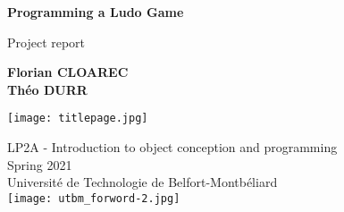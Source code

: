 \begin{titlepage}
    \begin{center}
        \vspace*{1cm}
            
        \Huge
        \textbf{Programming a Ludo Game}
            
        \vspace{0.5cm}
        \LARGE
        Project report
            
        \vspace{1.5cm}
            
        \textbf{Florian CLOAREC} \\
        \textbf{Théo DURR}
        
        \vspace{1.5cm}
        
        \texttt{[image: titlepage.jpg]}

        \vfill
                  
        
        \Large
        LP2A - Introduction to object conception and programming \\
        Spring 2021\\
        Université de Technologie de Belfort-Montbéliard\\
        \vspace{0.5cm}
        \texttt{[image: utbm\_forword-2.jpg]}
            
    \end{center}
\end{titlepage}